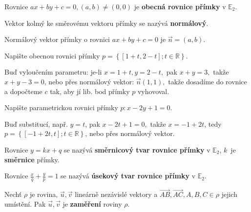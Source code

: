 \begin{definition}
    Rovnice $ax+by+c=0, (a,b)\ne(0,0)$ je \textbf{obecná rovnice přímky} v $\mathbb E_2$.
\end{definition}

\begin{definition}
    Vektor kolmý ke směrovému vektoru přímky se nazývá \textbf{normálový}.
\end{definition}

\begin{veta}
    Normálový vektor přímky o rovnici $ax+by+c=0$ je $\vec n=(a,b)$.
\end{veta}

\begin{priklad}
Napište obecnou rovnici přímky $p=\left \{ [1+t,2-t]; t \in \mathbb R \right \} .$
\end{priklad}

\begin{reseni}
Buď vyloučením parametru: je-li $x=1+t, y= 2-t,$ pak $x+y=3,$ takže $x+y-3=0$, nebo
přes normálový vektor: $\vec n(1,1),$ takže dosadíme do rovnice a dopočteme $c$ tak,
aby jí lib. bod přímky $p$ vyhovoval.
\end{reseni}

\begin{priklad}
Napište parametrickou rovnici přímky $p\colon x-2y+1=0.$
\end{priklad}

\begin{reseni}
Buď substitucí, např. $y=t$, pak $x-2t+1=0,$ takže $x=-1+2t$, tedy $p=\left \{ [-1+2t,t]; t \in \mathbb R \right \}$,
nebo přes normálový vektor.
\end{reseni}

\begin{definition}
    Rovnice $y=kx+q$ se nazývá \textbf{směrnicový tvar rovnice přímky} v $\mathbb E_2$,
    $k$~je \textbf{směrnice} přímky.
\end{definition}

\begin{definition}
Rovnice $\frac{x}{q}+\frac{y}{p}=1$ se nazývá \textbf{úsekový tvar rovnice přímky} v $\mathbb E_2$.
\end{definition}

\begin{definition}
Nechť $\rho$ je rovina, $\vec u, \vec v$ lineárně nezávislé vektory a $\overrightarrow{AB},
\overrightarrow{AC}, A,B,C\in \rho$ jejich umístění. Pak $\vec u, \vec v$ je
\textbf{zaměření} roviny $\rho.$
\end{definition}

